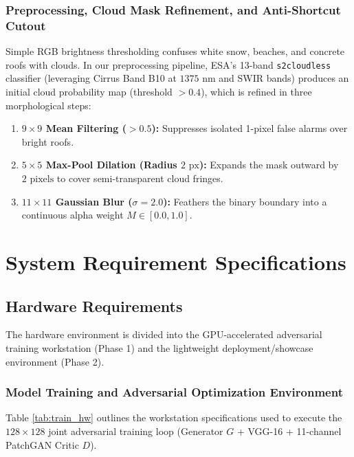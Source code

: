 \documentclass[12pt,a4paper]{report}
\begin{document}
\subsection{Preprocessing, Cloud Mask Refinement, and Anti-Shortcut Cutout}
Simple RGB brightness thresholding confuses white snow, beaches, and concrete roofs with clouds. In our preprocessing pipeline, ESA's 13-band \texttt{s2cloudless} classifier (leveraging Cirrus Band B10 at $1375\text{ nm}$ and SWIR bands) produces an initial cloud probability map (threshold $> 0.4$), which is refined in three morphological steps:
\begin{enumerate}
    \item \textbf{$9\times 9$ Mean Filtering ($> 0.5$):} Suppresses isolated 1-pixel false alarms over bright roofs.
    \item \textbf{$5\times 5$ Max-Pool Dilation (Radius $2\text{ px}$):} Expands the mask outward by $2\text{ pixels}$ to cover semi-transparent cloud fringes.
    \item \textbf{$11\times 11$ Gaussian Blur ($\sigma = 2.0$):} Feathers the binary boundary into a continuous alpha weight $M \in [0.0, 1.0]$.
\end{enumerate}

\chapter{System Requirement Specifications}

\section{Hardware Requirements}
The hardware environment is divided into the GPU-accelerated adversarial training workstation (Phase 1) and the lightweight deployment/showcase environment (Phase 2).

\subsection{Model Training and Adversarial Optimization Environment}
Table \ref{tab:train_hw} outlines the workstation specifications used to execute the $128\times 128$ joint adversarial training loop (Generator $G$ + VGG-16 + 11-channel PatchGAN Critic $D$).
\end{document}
